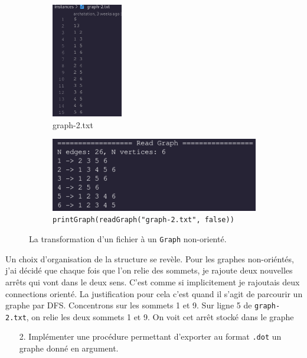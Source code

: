 \documentclass[10pt]{article} %
\begin{document}
\begin{figure}[h!]
    \centering
    \begin{subfigure}{0.45\textwidth}
        \centering
        \includegraphics[height=5cm]{media/graph2_txt.png}
        \caption{graph-2.txt}
    \end{subfigure}
    \hfill
    \begin{subfigure}{0.45\textwidth}
        \centering
        \includegraphics[width=\textwidth]{media/readGraph2.png}
        \caption{\texttt{printGraph(readGraph("graph-2.txt", false))}}
    \end{subfigure}
    \caption{La transformation d'un fichier à un \texttt{Graph} non-orienté.}
    \label{Fig:graph2}

\end{figure}

Un choix d'organisation de la structure se revèle. Pour les graphes non-oriéntés, j'ai décidé que chaque fois que l'on relie
des sommets, je rajoute deux nouvelles arrêts qui vont dans le deux sens. C'est comme si implicitement je rajoutais deux connections orienté.
La justification pour cela c'est quand il s'agit de parcourir un graphe par DFS. Concentrons sur les sommets 1 et 9. Sur ligne 5 de \texttt{graph-2.txt}, on relie
les deux sommets 1 et 9. On voit cet arrêt stocké dans le graphe

\begin{itemize}
    \item [2.] Implémenter une procédure permettant d'exporter au format \texttt{.dot} un graphe donné en argument.
\end{itemize}
\end{document}
